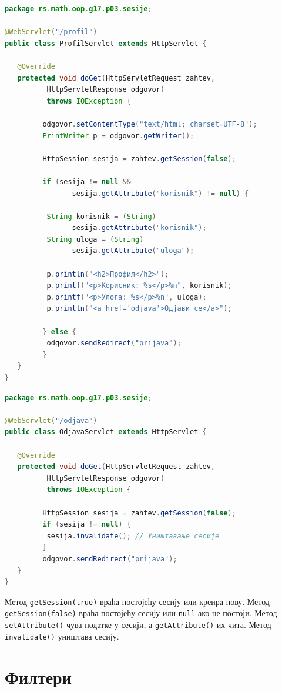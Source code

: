\begin{lstlisting}[language=Java]
package rs.math.oop.g17.p03.sesije;
 
@WebServlet("/profil")
public class ProfilServlet extends HttpServlet {
 
   @Override
   protected void doGet(HttpServletRequest zahtev,
          HttpServletResponse odgovor)
          throws IOException {
 
         odgovor.setContentType("text/html; charset=UTF-8");
         PrintWriter p = odgovor.getWriter();
 
         HttpSession sesija = zahtev.getSession(false);
 
         if (sesija != null &&
                sesija.getAttribute("korisnik") != null) {
 
          String korisnik = (String)
                sesija.getAttribute("korisnik");
          String uloga = (String)
                sesija.getAttribute("uloga");
 
          p.println("<h2>Профил</h2>");
          p.printf("<p>Корисник: %s</p>%n", korisnik);
          p.printf("<p>Улога: %s</p>%n", uloga);
          p.println("<a href='odjava'>Одјави се</a>");
 
         } else {
          odgovor.sendRedirect("prijava");
         }
   }
}
\end{lstlisting}


\begin{lstlisting}[language=Java]
package rs.math.oop.g17.p03.sesije;
 
@WebServlet("/odjava")
public class OdjavaServlet extends HttpServlet {
 
   @Override
   protected void doGet(HttpServletRequest zahtev,
          HttpServletResponse odgovor)
          throws IOException {
 
         HttpSession sesija = zahtev.getSession(false);
         if (sesija != null) {
          sesija.invalidate(); // Уништавање сесије
         }
         odgovor.sendRedirect("prijava");
   }
}
\end{lstlisting}


Метод \texttt{getSession(true)} враћа постојећу сесију или креира нову. Метод \texttt{getSession(false)} враћа постојећу сесију или \texttt{null} ако не постоји. Метод \texttt{setAttribute()} чува податке у сесији, а \texttt{getAttribute()} их чита. Метод \texttt{invalidate()} уништава сесију.


\section{Филтери}

